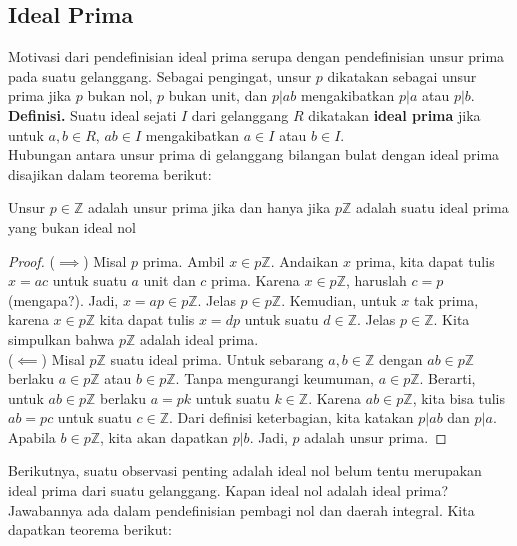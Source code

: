 	\subsection{Ideal Prima}
	Motivasi dari pendefinisian ideal prima serupa dengan pendefinisian unsur prima pada suatu gelanggang. Sebagai pengingat, unsur $p$ dikatakan sebagai unsur prima jika $p$ bukan nol, $p$ bukan unit, dan $p | ab$ mengakibatkan $p | a$ atau $p | b$.\\
	
	\textbf{Definisi.} Suatu ideal sejati $I$ dari gelanggang $R$ dikatakan \textbf{ideal prima} jika  untuk $a,b \in R$, $ab \in I$ mengakibatkan $a \in I$ atau $b \in I$.
	\\
	
	Hubungan antara unsur prima di gelanggang bilangan bulat dengan ideal prima disajikan dalam teorema berikut:
	
	\begin{theorem}
		\label{id-prime}
		Unsur $p \in \mathbb{Z}$ adalah unsur prima jika dan hanya jika $p\mathbb{Z}$ adalah suatu ideal prima yang bukan ideal nol
	\end{theorem}
	\begin{proof}
		($\implies$) Misal $p$ prima. Ambil $x \in p\mathbb{Z}$. Andaikan $x$ prima, kita dapat tulis $x = ac$ untuk suatu $a$ unit dan $c$ prima. Karena $x \in p\mathbb{Z}$, haruslah $c = p$ (mengapa?). Jadi, $x = ap \in p\mathbb{Z}$. Jelas $p \in p\mathbb{Z}$. Kemudian, untuk $x$ tak prima, karena $x \in p\mathbb{Z}$ kita dapat tulis $x = dp$ untuk suatu $d \in \mathbb{Z}$. Jelas $p \in \mathbb{Z}$. Kita simpulkan bahwa $p\mathbb{Z}$ adalah ideal prima.\\
		
		($\impliedby$) Misal $p\mathbb{Z}$ suatu ideal prima. Untuk sebarang $a,b \in \mathbb{Z}$ dengan $ab \in p\mathbb{Z}$ berlaku $a \in p\mathbb{Z}$ atau $b \in p\mathbb{Z}$. Tanpa mengurangi keumuman, $a \in p\mathbb{Z}$. Berarti, untuk $ab \in p\mathbb{Z}$ berlaku $a = pk$ untuk suatu $k \in \mathbb{Z}$. Karena $ab \in p\mathbb{Z}$, kita bisa tulis $ab = pc$ untuk suatu $c \in \mathbb{Z}$. Dari definisi keterbagian, kita katakan $p | ab$ dan $p|a$. Apabila $b \in p\mathbb{Z}$, kita akan dapatkan $p | b$. Jadi, $p$ adalah unsur prima.
	\end{proof}
	Berikutnya, suatu observasi penting adalah ideal nol belum tentu merupakan ideal prima dari suatu gelanggang. Kapan ideal nol adalah ideal prima? Jawabannya ada dalam pendefinisian pembagi nol dan daerah integral. Kita dapatkan teorema berikut:
	
